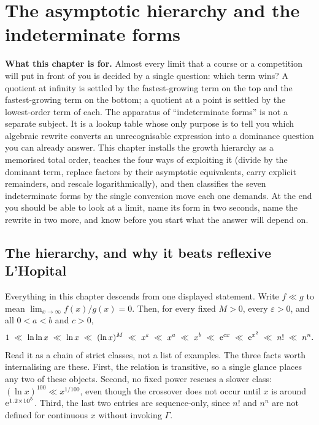 \chapter{The asymptotic hierarchy and the indeterminate forms}

\begin{orient}
\textbf{What this chapter is for.} Almost every limit that a course or a competition will put in front of you is decided by a single question: which term wins? A quotient at infinity is settled by the fastest-growing term on the top and the fastest-growing term on the bottom; a quotient at a point is settled by the lowest-order term of each. The apparatus of ``indeterminate forms'' is not a separate subject. It is a lookup table whose only purpose is to tell you which algebraic rewrite converts an unrecognisable expression into a dominance question you can already answer. This chapter installs the growth hierarchy as a memorised total order, teaches the four ways of exploiting it (divide by the dominant term, replace factors by their asymptotic equivalents, carry explicit remainders, and rescale logarithmically), and then classifies the seven indeterminate forms by the single conversion move each one demands. At the end you should be able to look at a limit, name its form in two seconds, name the rewrite in two more, and know before you start what the answer will depend on.
\end{orient}

\section{The hierarchy, and why it beats reflexive L'Hopital}

Everything in this chapter descends from one displayed statement. Write $f\ll g$ to mean $\lim_{x\to\infty}f(x)/g(x)=0$. Then, for every fixed $M>0$, every $\varepsilon>0$, and all $0<a<b$ and $c>0$,
\[
1\ \ll\ \ln\ln x\ \ll\ \ln x\ \ll\ (\ln x)^{M}\ \ll\ x^{\varepsilon}\ \ll\ x^{a}\ \ll\ x^{b}\ \ll\ \eu^{cx}\ \ll\ \eu^{x^{2}}\ \ll\ n!\ \ll\ n^{n}.
\]
Read it as a chain of strict classes, not a list of examples. The three facts worth internalising are these. First, the relation is transitive, so a single glance places any two of these objects. Second, no fixed power rescues a slower class: $(\ln x)^{100}\ll x^{1/100}$, even though the crossover does not occur until $x$ is around $\mathrm{e}^{1.2\times10^{5}}$. Third, the last two entries are sequence-only, since $n!$ and $n^{n}$ are not defined for continuous $x$ without invoking $\Gamma$.

